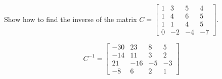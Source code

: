 
\begin{exerciseStatement}


Show how to find the inverse of the matrix \(C= \left[\begin{array}{cccc}
1 & 3 & 5 & 4 \\
1 & 4 & 6 & 5 \\
1 & 1 & 4 & 5 \\
0 & -2 & -4 & -7
\end{array}\right] \).


\end{exerciseStatement}
    
\begin{exerciseAnswer} 
\[C^{-1}= \left[\begin{array}{cccc}
-30 & 23 & 8 & 5 \\
-14 & 11 & 3 & 2 \\
21 & -16 & -5 & -3 \\
-8 & 6 & 2 & 1
\end{array}\right] \]
\end{exerciseAnswer}
    
